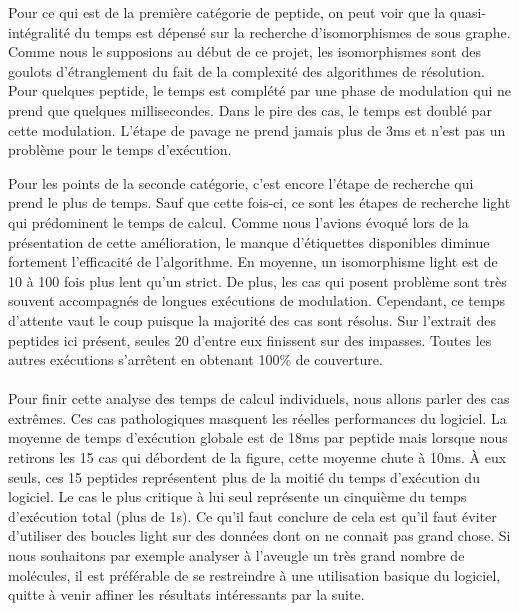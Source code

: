\documentclass[12pt,french,twoside]{report}
\begin{document}
Pour ce qui est de la première catégorie de peptide, on peut voir que la quasi-intégralité du temps est dépensé sur la recherche d'isomorphismes de sous graphe.
Comme nous le supposions au début de ce projet, les isomorphismes sont des goulots d'étranglement du fait de la complexité des algorithmes de résolution.
Pour quelques peptide, le temps est complété par une phase de modulation qui ne prend que quelques millisecondes.
Dans le pire des cas, le temps est doublé par cette modulation.
L'étape de pavage ne prend jamais plus de 3ms et n'est pas un problème pour le temps d'exécution.

Pour les points de la seconde catégorie, c'est encore l'étape de recherche qui prend le plus de temps.
Sauf que cette fois-ci, ce sont les étapes de recherche light qui prédominent le temps de calcul.
Comme nous l'avions évoqué lors de la présentation de cette amélioration, le manque d'étiquettes disponibles diminue fortement l'efficacité de l'algorithme.
En moyenne, un isomorphisme light est de 10 à 100 fois plus lent qu'un strict.
De plus, les cas qui posent problème sont très souvent accompagnés de longues exécutions de modulation.
Cependant, ce temps d'attente vaut le coup puisque la majorité des cas sont résolus.
Sur l'extrait des peptides ici présent, seules 20 d'entre eux finissent sur des impasses.
Toutes les autres exécutions s'arrêtent en obtenant 100\% de couverture.

\paragraph{}Pour finir cette analyse des temps de calcul individuels, nous allons parler des cas extrêmes.
Ces cas pathologiques masquent les réelles performances du logiciel.
La moyenne de temps d'exécution globale est de 18ms par peptide mais lorsque nous retirons les 15 cas qui débordent de la figure, cette moyenne chute à 10ms.
À eux seuls, ces 15 peptides représentent plus de la moitié du temps d'exécution du logiciel.
Le cas le plus critique à lui seul représente un cinquième du temps d'exécution total (plus de 1s).
Ce qu'il faut conclure de cela est qu'il faut éviter d'utiliser des boucles light sur des données dont on ne connait pas grand chose.
Si nous souhaitons par exemple analyser à l'aveugle un très grand nombre de molécules, il est préférable de se restreindre à une utilisation basique du logiciel, quitte à venir affiner les résultats intéressants par la suite.
\end{document}
